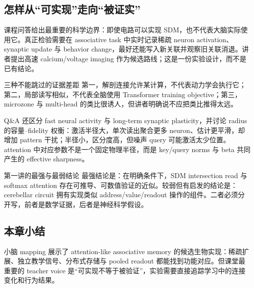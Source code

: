 

\subsection{怎样从“可实现”走向“被证实”}

课程问答给出最重要的科学边界：即使电路可以实现 SDM，也不代表大脑实际使用它。真正检验需要在 associative task 中实时记录稀疏 neuron activation、synaptic update 与 behavior change，最好还能写入新关联并观察旧关联消退。讲者提出高速 calcium/voltage imaging 作为候选路线；这是一份实验设计，而不是已有结论。

\begin{warningbox}{三种不能跳过的证据差距}
第一，解剖连接允许某计算，不代表动力学会执行它；第二，局部读写相似，不代表全脑使用 Transformer training objective；第三，microzone 与 multi-head 的类比很诱人，但讲者明确说不应把类比推得太远。
\end{warningbox}

Q\&A 还区分 fast neural activity 与 long-term synaptic plasticity，并讨论 radius 的容量--fidelity 权衡：激活半径大，单次读出聚合更多 neuron、估计更平滑，却增加 pattern 干扰；半径小，区分度高，但噪声 query 可能激活太少位置。attention 中对应参数不是一个固定物理半径，而是 key/query norms 与 beta 共同产生的 effective sharpness。


\begin{importantbox}{第一讲的最强与最弱结论}
最强结论是：在明确条件下，SDM intersection read 与 softmax attention 存在可推导、可数值验证的近似。较弱但有启发的结论是：cerebellar circuit 拥有实现类似 address/value/readout 操作的组件。二者必须分开写，前者是数学证据，后者是神经科学假设。
\end{importantbox}

\subsection{本章小结}

小脑 mapping 展示了 attention-like associative memory 的候选生物实现：稀疏扩展、独立教学信号、分布式存储与 pooled readout 都能找到功能对应。但课堂最重要的 teacher voice 是“可实现不等于被验证”，实验需要直接追踪学习中的连接变化和行为结果。

